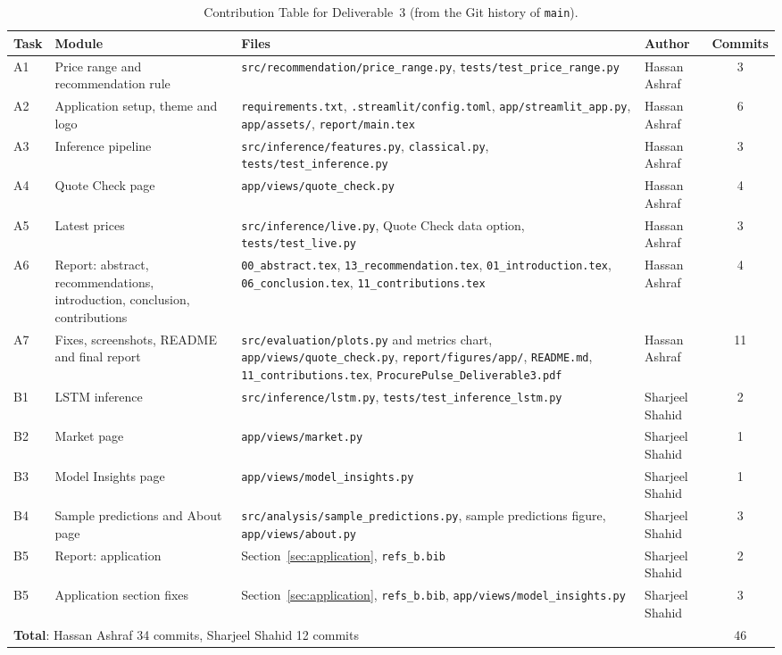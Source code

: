 \begin{table}[H]
  \centering
  \small
  \sloppy
  \begin{tabular}{p{0.8cm}p{3.1cm}p{6.3cm}p{2.5cm}c}
    \toprule
    Task & Module & Files & Author & Commits \\
    \midrule
    A1 & Price range and recommendation rule & \texttt{src/recommendation/price\_range.py}, \texttt{tests/test\_price\_range.py} & Hassan Ashraf & 3 \\
    A2 & Application setup, theme and logo & \texttt{requirements.txt}, \texttt{.streamlit/config.toml}, \texttt{app/streamlit\_app.py}, \texttt{app/assets/}, \texttt{report/main.tex} & Hassan Ashraf & 6 \\
    A3 & Inference pipeline & \texttt{src/inference/features.py}, \texttt{classical.py}, \texttt{tests/test\_inference.py} & Hassan Ashraf & 3 \\
    A4 & Quote Check page & \texttt{app/views/quote\_check.py} & Hassan Ashraf & 4 \\
    A5 & Latest prices & \texttt{src/inference/live.py}, Quote Check data option, \texttt{tests/test\_live.py} & Hassan Ashraf & 3 \\
    A6 & Report: abstract, recommendations, introduction, conclusion, contributions & \texttt{00\_abstract.tex}, \texttt{13\_recommendation.tex}, \texttt{01\_introduction.tex}, \texttt{06\_conclusion.tex}, \texttt{11\_contributions.tex} & Hassan Ashraf & 4 \\
    A7 & Fixes, screenshots, README and final report & \texttt{src/evaluation/plots.py} and metrics chart, \texttt{app/views/quote\_check.py}, \texttt{report/figures/app/}, \texttt{README.md}, \texttt{11\_contributions.tex}, \texttt{ProcurePulse\_Deliverable3.pdf} & Hassan Ashraf & 11 \\
    \midrule
    B1 & LSTM inference & \texttt{src/inference/lstm.py}, \texttt{tests/test\_inference\_lstm.py} & Sharjeel Shahid & 2 \\
    B2 & Market page & \texttt{app/views/market.py} & Sharjeel Shahid & 1 \\
    B3 & Model Insights page & \texttt{app/views/model\_insights.py} & Sharjeel Shahid & 1 \\
    B4 & Sample predictions and About page & \texttt{src/analysis/sample\_predictions.py}, sample predictions figure, \texttt{app/views/about.py} & Sharjeel Shahid & 3 \\
    B5 & Report: application & Section~\ref{sec:application}, \texttt{refs\_b.bib} & Sharjeel Shahid & 2 \\
    B5 & Application section fixes & Section~\ref{sec:application}, \texttt{refs\_b.bib}, \texttt{app/views/model\_insights.py} & Sharjeel Shahid & 3 \\
    \midrule
    \multicolumn{4}{l}{\textbf{Total}: Hassan Ashraf 34 commits, Sharjeel Shahid 12 commits} & 46 \\
    \bottomrule
  \end{tabular}
  \caption{Contribution Table for Deliverable~3 (from the Git history of \texttt{main}).}
  \label{tab:contributions-d3}
\end{table}

